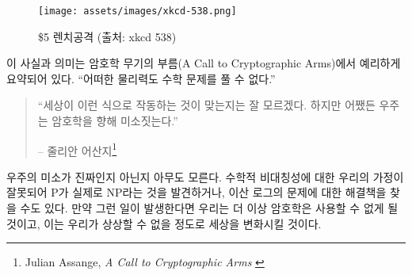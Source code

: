 \begin{figure}
	\centering
	\texttt{[image: assets/images/xkcd-538.png]}
	\caption{\$5 렌치공격 (출처: xkcd 538)}
	\label{fig:xkcd-538}
\end{figure}

\begin{comment}
	This fact and its implications were poignantly summarized in the call
	to cryptographic arms: \textit{\enquote{No amount of coercive force will ever solve
			a math problem.}
	\end{comment}
	이 사실과 의미는 암호학 무기의 부름(A Call to Cryptographic Arms)에서 예리하게 요약되어 있다.
	\enquote{어떠한 물리력도 수학 문제를 풀 수 없다.}
	
	\begin{comment}
		\begin{quotation}\begin{samepage}
				\enquote{It isn't obvious that the world had to work this way. But somehow the
					universe smiles on encryption.}
				\begin{flushright} -- Julian Assange\footnote{Julian Assange, \textit{A Call to Cryptographic Arms} \cite{call-to-cryptographic-arms}}
		\end{flushright}\end{samepage}\end{quotation}
	\end{comment}
	\begin{quotation}\begin{samepage}
			\enquote{세상이 이런 식으로 작동하는 것이 맞는지는 잘 모르겠다. 하지만 어쨌든 우주는 암호학을 향해 미소짓는다.}
			\begin{flushright} -- 줄리안 어산지\footnote{Julian Assange, \textit{A Call to Cryptographic Arms} \cite{call-to-cryptographic-arms}}
	\end{flushright}\end{samepage}\end{quotation}
	
	\begin{comment}
		Nobody yet knows for sure if the universe's smile is genuine or not. It
		is possible that our assumption of mathematical asymmetries is wrong and
		we find that P actually equals NP \cite{wiki:pnp}, or we find surprisingly quick
		solutions to specific problems \cite{wiki:discrete-log} which we currently assume to be hard.
		If that should be the case, cryptography as we know it will cease to
		exist, and the implications would most likely change the world beyond
		recognition.
	\end{comment}
	우주의 미소가 진짜인지 아닌지 아무도 모른다. 
	수학적 비대칭성에 대한 우리의 가정이 잘못되어 P가 실제로 NP\cite{wiki:pnp}라는 것을 발견하거나, 이산 로그의 문제\cite{wiki:discrete-log}에 대한 해결책을 찾을 수도 있다. 
	만약 그런 일이 발생한다면 우리는 더 이상 암호학은 사용할 수 없게 될 것이고, 
	이는 우리가 상상할 수 없을 정도로 세상을 변화시킬 것이다.
	
